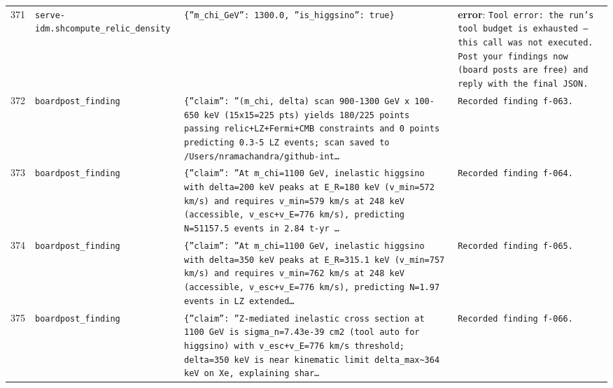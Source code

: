 \documentclass[11pt,a4paper]{article}
\begin{document}
\begin{longtable}{@{}p{}p{}p{}p{}@{}}
371 & \texttt{serve-idm.sh}\newline\texttt{compute\_\allowbreak{}relic\_\allowbreak{}density} & \texttt{\{''m\_\allowbreak{}chi\_\allowbreak{}GeV'':\allowbreak{} 1300.0,\allowbreak{} ''is\_\allowbreak{}higgsino'':\allowbreak{} true\}\allowbreak{}} & \textbf{error}: \texttt{Tool error:\allowbreak{} the run's tool budget is exhausted --- this call was not executed. Post your findings now (board posts are free)\allowbreak{} and reply with the final JSON.} \\
372 & \texttt{board}\newline\texttt{post\_\allowbreak{}finding} & \texttt{\{''claim'':\allowbreak{} ''(m\_\allowbreak{}chi,\allowbreak{} delta)\allowbreak{} scan 900-1300 GeV x 100-650 keV (15x15=\allowbreak{}225 pts)\allowbreak{} yields 180/\allowbreak{}225 points passing relic+LZ+Fermi+CMB constraints and 0 points predicting 0.3-5 LZ events;\allowbreak{} scan saved to /\allowbreak{}Users/\allowbreak{}nramachandra/\allowbreak{}github-int\ldots{}\allowbreak{}} & \texttt{Recorded finding f-063.} \\
373 & \texttt{board}\newline\texttt{post\_\allowbreak{}finding} & \texttt{\{''claim'':\allowbreak{} ''At m\_\allowbreak{}chi=\allowbreak{}1100 GeV,\allowbreak{} inelastic higgsino with delta=\allowbreak{}200 keV peaks at E\_\allowbreak{}R=\allowbreak{}180 keV (v\_\allowbreak{}min=\allowbreak{}572 km/\allowbreak{}s)\allowbreak{} and requires v\_\allowbreak{}min=\allowbreak{}579 km/\allowbreak{}s at 248 keV (accessible,\allowbreak{} v\_\allowbreak{}esc+v\_\allowbreak{}E=\allowbreak{}776 km/\allowbreak{}s)\allowbreak{},\allowbreak{} predicting N=\allowbreak{}51157.5 events in 2.84 t-yr \ldots{}\allowbreak{}} & \texttt{Recorded finding f-064.} \\
374 & \texttt{board}\newline\texttt{post\_\allowbreak{}finding} & \texttt{\{''claim'':\allowbreak{} ''At m\_\allowbreak{}chi=\allowbreak{}1100 GeV,\allowbreak{} inelastic higgsino with delta=\allowbreak{}350 keV peaks at E\_\allowbreak{}R=\allowbreak{}315.1 keV (v\_\allowbreak{}min=\allowbreak{}757 km/\allowbreak{}s)\allowbreak{} and requires v\_\allowbreak{}min=\allowbreak{}762 km/\allowbreak{}s at 248 keV (accessible,\allowbreak{} v\_\allowbreak{}esc+v\_\allowbreak{}E=\allowbreak{}776 km/\allowbreak{}s)\allowbreak{},\allowbreak{} predicting N=\allowbreak{}1.97 events in LZ extended\ldots{}\allowbreak{}} & \texttt{Recorded finding f-065.} \\
375 & \texttt{board}\newline\texttt{post\_\allowbreak{}finding} & \texttt{\{''claim'':\allowbreak{} ''Z-mediated inelastic cross section at 1100 GeV is sigma\_\allowbreak{}n=\allowbreak{}7.43e-39 cm2 (tool auto for higgsino)\allowbreak{} with v\_\allowbreak{}esc+v\_\allowbreak{}E=\allowbreak{}776 km/\allowbreak{}s threshold;\allowbreak{} delta=\allowbreak{}350 keV is near kinematic limit delta\_\allowbreak{}max\textasciitilde{}\allowbreak{}364 keV on Xe,\allowbreak{} explaining shar\ldots{}\allowbreak{}} & \texttt{Recorded finding f-066.} \\

\end{longtable}
\end{document}
